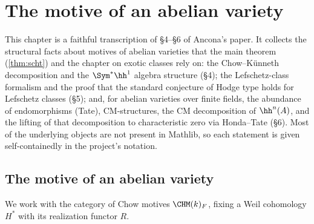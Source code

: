 \chapter{The motive of an abelian variety}

This chapter is a faithful transcription of \S4--\S6 of Ancona's paper. It
collects the structural facts about motives of abelian varieties that the main
theorem (\cref{thm:scht}) and the chapter on exotic classes rely on: the
Chow--K\"unneth decomposition and the \(\Sym^*\hh^1\) algebra structure
(\S4); the Lefschetz-class formalism and the proof that the standard conjecture
of Hodge type holds for Lefschetz classes (\S5); and, for abelian varieties over
finite fields, the abundance of endomorphisms (Tate), CM-structures, the CM
decomposition of \(\hh^n(A)\), and the lifting of that decomposition to
characteristic zero via Honda--Tate (\S6). Most of the underlying objects are
not present in Mathlib, so each statement is given self-containedly in the
project's notation.

\providecommand{\Frob}{\mathrm{Frob}}
\providecommand{\GSp}{\mathrm{GSp}}

\section{The motive of an abelian variety}

We work with the category of Chow motives \(\CHM(k)_{F}\), fixing a Weil
cohomology \(H^*\) with its realization functor \(R\).

